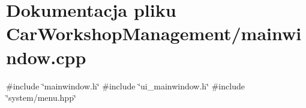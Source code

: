 \section{Dokumentacja pliku Car\+Workshop\+Management/mainwindow.cpp}
\label{mainwindow_8cpp}
{\ttfamily \#include \char`\"{}mainwindow.\+h\char`\"{}}\newline
{\ttfamily \#include \char`\"{}ui\+\_\+mainwindow.\+h\char`\"{}}\newline
{\ttfamily \#include \char`\"{}system/menu.\+hpp\char`\"{}}\newline
